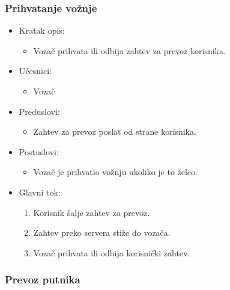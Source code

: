 \subsubsection{\bfseries Prihvatanje vožnje}

\begin{itemize}
	\item Kratak opis:
		\begin{itemize}
			\item Vozač prihvata ili odbija zahtev za prevoz korisnika.
		\end{itemize}
	\item Učesnici:
		\begin{itemize}
		    \item Vozač
		\end{itemize}			
	\item Preduslovi:
		\begin{itemize}
		    \item Zahtev za prevoz poslat od strane korisnika.
		\end{itemize}
	\item Postuslovi:
		\begin{itemize}
			\item Vozač je prihvatio vožnju ukoliko je to želeo.
		\end{itemize}		
	\item Glavni tok:
		\begin{enumerate}
		    \item Korisnik šalje zahtev za prevoz.
		    \item Zahtev preko servera stiže do vozača.
		    \item Vozač prihvata ili odbija korisnički zahtev.
		\end{enumerate}
\end{itemize}


\subsubsection{\bfseries Prevoz putnika}

